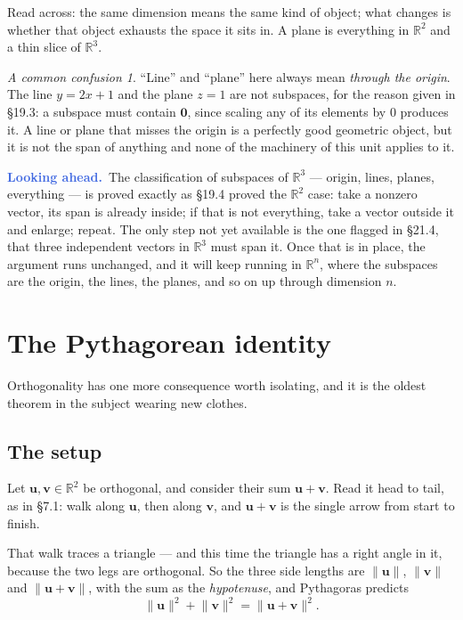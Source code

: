 \documentclass[11pt]{article}
\theoremstyle{definition}
\theoremstyle{remark}
\newtheorem*{warn}{A common confusion}
\newcommand{\lookahead}{\par\smallskip\noindent
  \textbf{\sffamily\textcolor{RoyalBlue}{Looking ahead.}}\ \ignorespaces}
\newcommand{\R}{\mathbb{R}}
\newcommand{\vc}[1]{\mathbf{#1}}
\newcommand{\norm}[1]{\lVert #1\rVert}
\begin{document}
\noindent Read across: the same dimension means the same kind of object; what
changes is whether that object exhausts the space it sits in. A plane is
everything in $\R^{2}$ and a thin slice of $\R^{3}$.

\begin{warn}
``Line'' and ``plane'' here always mean \emph{through the origin}. The line
$y=2x+1$ and the plane $z=1$ are not subspaces, for the reason given in \S19.3:
a subspace must contain $\vc{0}$, since scaling any of its elements by $0$
produces it. A line or plane that misses the origin is a perfectly good
geometric object, but it is not the span of anything and none of the machinery
of this unit applies to it.
\end{warn}

\lookahead The classification of subspaces of $\R^{3}$ --- origin, lines,
planes, everything --- is proved exactly as \S19.4 proved the $\R^{2}$ case:
take a nonzero vector, its span is already inside; if that is not everything,
take a vector outside it and enlarge; repeat. The only step not yet available is
the one flagged in \S21.4, that three independent vectors in $\R^{3}$ must span
it. Once that is in place, the argument runs unchanged, and it will keep running
in $\R^{n}$, where the subspaces are the origin, the lines, the planes, and so
on up through dimension $n$.

\section{The Pythagorean identity}
Orthogonality has one more consequence worth isolating, and it is the oldest
theorem in the subject wearing new clothes.

\subsection{The setup}
Let $\vc{u},\vc{v}\in\R^{2}$ be orthogonal, and consider their sum
$\vc{u}+\vc{v}$. Read it head to tail, as in \S7.1: walk along $\vc{u}$, then
along $\vc{v}$, and $\vc{u}+\vc{v}$ is the single arrow from start to finish.

That walk traces a triangle --- and this time the triangle has a right angle in
it, because the two legs are orthogonal. So the three side lengths are
$\norm{\vc{u}}$, $\norm{\vc{v}}$ and $\norm{\vc{u}+\vc{v}}$, with the sum as the
\emph{hypotenuse}, and Pythagoras predicts
\[
  \norm{\vc{u}}^{2} + \norm{\vc{v}}^{2} = \norm{\vc{u}+\vc{v}}^{2} .
\]
\end{document}
